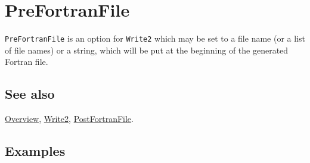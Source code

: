 \documentclass[../FeynCalcManual.tex]{subfiles}
\begin{document}
\hypertarget{prefortranfile}{
\section{PreFortranFile}\label{prefortranfile}}

\texttt{PreFortranFile} is an option for \texttt{Write2} which may be
set to a file name (or a list of file names) or a string, which will be
put at the beginning of the generated Fortran file.

\subsection{See also}

\hyperlink{toc}{Overview}, \hyperlink{write2}{Write2},
\hyperlink{postfortranfile}{PostFortranFile}.

\subsection{Examples}
\end{document}
